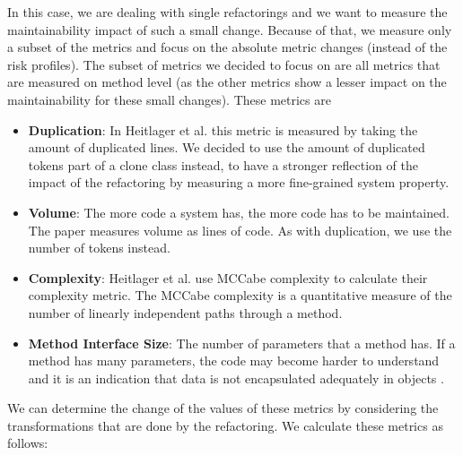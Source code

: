 In this case, we are dealing with single refactorings and we want to measure the maintainability impact of such a small change. Because of that, we measure only a subset of the metrics \cite{heitlager2007practical} and focus on the absolute metric changes (instead of the risk profiles). The subset of metrics we decided to focus on are all metrics that are measured on method level (as the other metrics show a lesser impact on the maintainability for these small changes). These metrics are
\begin{itemize}
\item \textbf{Duplication}: In Heitlager et al. \cite{heitlager2007practical} this metric is measured by taking the amount of duplicated lines. We decided to use the amount of duplicated tokens part of a clone class instead, to have a stronger reflection of the impact of the refactoring by measuring a more fine-grained system property.
\item \textbf{Volume}: The more code a system has, the more code has to be maintained. The paper \cite{heitlager2007practical} measures volume as lines of code. As with duplication, we use the number of tokens instead.
\item \textbf{Complexity}: Heitlager et al. use MCCabe complexity \cite{mccabe1976complexity} to calculate their complexity metric. The MCCabe complexity is a quantitative measure of the number of linearly independent paths through a method.
\item \textbf{Method Interface Size}: The number of parameters that a method has. If a method has many parameters, the code may become harder to understand and it is an indication that data is not encapsulated adequately in objects \cite{fowler2018refactoring}.
\end{itemize}

We can determine the change of the values of these metrics by considering the transformations that are done by the refactoring. We calculate these metrics as follows:

